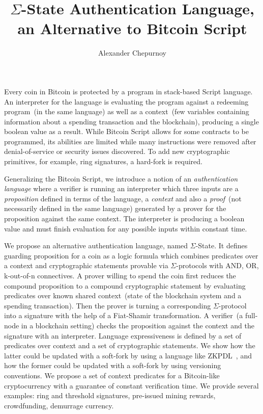 \documentclass[article]{llncs}
\newcommand\TOCwithBibliography[2][plain]{%
  \begingroup
    \let\clearpage\relax
    
    
  \endgroup
  \clearpage
}
\begin{document}
\title{$\Sigma$-State Authentication Language,\\ an Alternative to Bitcoin Script}

\author{Alexander Chepurnoy}


\maketitle

Every coin in Bitcoin is protected by a program in stack-based Script language. An interpreter for the language is evaluating the program against a redeeming program~(in the same language) as well as a context~(few variables containing information about a spending transaction and the blockchain), producing a single boolean value as a result. While Bitcoin Script allows for some contracts to be programmed, its abilities are limited while many instructions were removed after denial-of-service or security issues discovered. To add new cryptographic primitives, for example, ring signatures, a hard-fork is required. 

Generalizing the Bitcoin Script, we introduce a notion of an \textit{authentication language} where a verifier is running an interpreter which three inputs are a \textit{proposition} defined in terms of the language, a \textit{context} and also a \textit{proof}~(not necessarily defined in the same language) generated by a prover for the proposition against the same context. The interpreter is producing a boolean value and must finish evaluation for any possible inputs within constant time.


We propose an alternative authentication language, named $\Sigma$-State. It defines guarding proposition for a coin as a logic formula which combines predicates over a context and cryptographic statements provable via $\Sigma$-protocols with AND, OR, k-out-of-n connectives. A prover willing to spend the coin first reduces the compound proposition to a compound cryptographic statement by evaluating predicates over known shared context~(state of the blockchain system and a spending transaction). Then the prover is turning a corresponding $\Sigma$-protocol into a signature with the help of a Fiat-Shamir transformation. A verifier~(a full-node in a blockchain setting) checks the proposition against the context and the signature with an interpreter. Language expressiveness is defined by a set of predicates over context and a set of cryptographic statements. We show how the latter could be updated with a soft-fork by using a language like ZKPDL~\cite{meiklejohn2010zkpdl}, and how the former could be updated with a soft-fork by using versioning conventions. We propose a set of context predicates for a Bitcoin-like cryptocurrency with a guarantee of constant verification time. We provide several examples: ring and threshold signatures, pre-issued mining rewards, crowdfunding, demurrage currency.

\TOCwithBibliography{sources}
\end{document}
